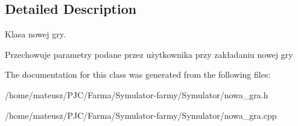 \subsection{Detailed Description}
Klasa nowej gry. 

Przechowuje parametry podane przez użytkownika przy zakładaniu nowej gry 

The documentation for this class was generated from the following files\+:\begin{DoxyCompactItemize}
\item 
/home/mateusz/\+P\+J\+C/\+Farma/\+Symulator-\/farmy/\+Symulator/nowa\+\_\+gra.\+h\item 
/home/mateusz/\+P\+J\+C/\+Farma/\+Symulator-\/farmy/\+Symulator/nowa\+\_\+gra.\+cpp\end{DoxyCompactItemize}
